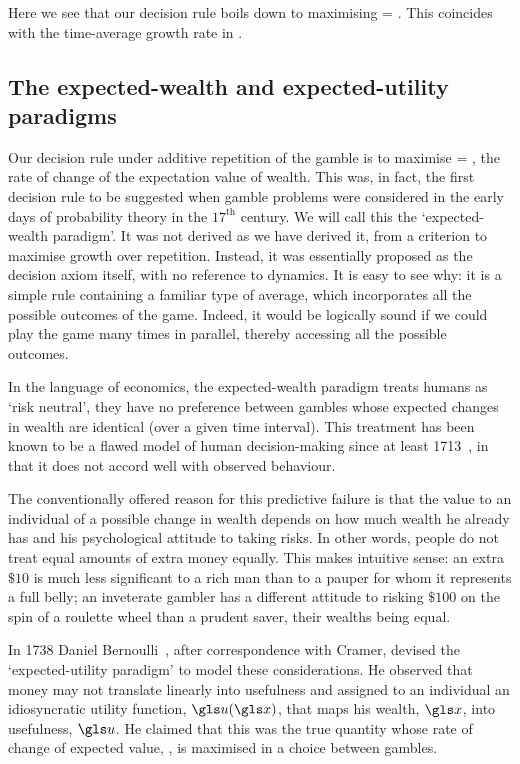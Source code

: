 Here we see that our decision rule boils down to maximising
\be
\ave{\frac{\ln \gr}{\dt}} = \ave{\frac{\ln(\x(\tn)+\q)-\ln \x(\tn)}{\dt}}.
\ee
This coincides with the time-average growth rate in .

\subsection{The expected-wealth and expected-utility paradigms}
Our decision rule under additive repetition of the gamble is to maximise
\be
\ave{\frac{\d\x}{\dt}} = \ave{\frac{\q}{\dt}},
\ee
\ie the rate of change of the expectation value of wealth. This was, in fact, the first 
decision rule to be suggested when gamble problems were considered in the early 
days of probability theory in the $17^\text{th}$ century. We will call this the 
`expected-wealth paradigm'. It was not derived as we have derived it, from a 
criterion to maximise growth over repetition. Instead, it was essentially proposed 
as the decision axiom itself, with no reference to dynamics. It is easy to see why: 
it is a simple rule containing a familiar type of average, which incorporates all the 
possible outcomes of the game. Indeed, it would be logically sound if we could play 
the game many times in parallel, thereby accessing all the possible outcomes.

In the language of economics, the expected-wealth paradigm treats humans as 
`risk neutral', \ie they have no preference between gambles whose expected 
changes in wealth are identical (over a given time interval). This treatment has 
been known to be a flawed model of human decision-making since at least 
1713~\cite[p.~402]{Montmort1713}, in that it does not accord well with observed behaviour.

The conventionally offered reason for this predictive failure is that the value to an 
individual of a possible change in wealth depends on how much wealth he already 
has and his psychological attitude to taking risks. In other words, people do not 
treat equal amounts of extra money equally. This makes intuitive sense: an extra 
$\$10$ is much less significant to a rich man than to a pauper for whom it 
represents a full belly; an inveterate gambler has a different attitude to risking 
$\$100$ on the spin of a roulette wheel than a prudent saver, their wealths 
being equal.

In 1738 Daniel Bernoulli~\cite{Bernoulli1738}, after correspondence with Cramer, devised the `expected-utility paradigm' to model these considerations. He observed that money may not translate linearly into usefulness and assigned to an individual an idiosyncratic utility function, $\gu(\x)$, that maps his wealth, $\x$, 
into usefulness, $\gu$. He claimed that this was the true quantity whose rate of change of expected value,
\be
\ave{\gr_\gu} \equiv \ave{\frac{\d\gu(\x)}{\dt}},
\ee
is maximised in a choice between gambles.

